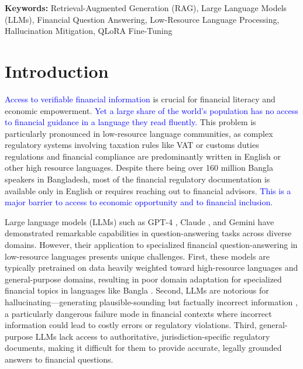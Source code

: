 \documentclass{article}
\newcommand{\revised}[1]{\textcolor{blue}{#1}}
\newcommand{\revised}[1]{#1}
\begin{document}
\noindent\textbf{Keywords:} Retrieval-Augmented Generation (RAG), Large Language
Models (LLMs), Financial Question Answering, Low-Resource Language Processing,
Hallucination Mitigation, QLoRA Fine-Tuning

\section{Introduction}

\revised{Access to verifiable financial information} is crucial for financial literacy
and economic empowerment. \revised{Yet a large share of the world's population has no
access to financial guidance in a language they read fluently.} This problem is
particularly pronounced in low-resource language communities, as complex regulatory
systems involving taxation rules like VAT or customs duties regulations and financial
compliance are predominantly written in English or other high resource languages.
Despite there being over 160 million Bangla speakers in Bangladesh, most of the
financial regulatory documentation is available only in English or requires reaching
out to financial advisors. \revised{This is a major barrier to access to economic
opportunity and to financial inclusion.}

Large language models (LLMs) such as GPT-4 \cite{OpenAI2023}, Claude \cite{Bai2022},
and Gemini \cite{Anil2023} have demonstrated remarkable capabilities in
question-answering tasks across diverse domains. However, their application to
specialized financial question-answering in low-resource languages presents unique
challenges. First, these models are typically pretrained on data heavily weighted
toward high-resource languages and general-purpose domains, resulting in poor domain
adaptation for specialized financial topics in languages like Bangla
\cite{ramponi2020}. Second, LLMs are notorious for hallucinating---generating
plausible-sounding but factually incorrect information \cite{Ji2023}, a particularly
dangerous failure mode in financial contexts where incorrect information could lead to
costly errors or regulatory violations. Third, general-purpose LLMs lack access to
authoritative, jurisdiction-specific regulatory documents, making it difficult for them
to provide accurate, legally grounded answers to financial questions.
\end{document}

